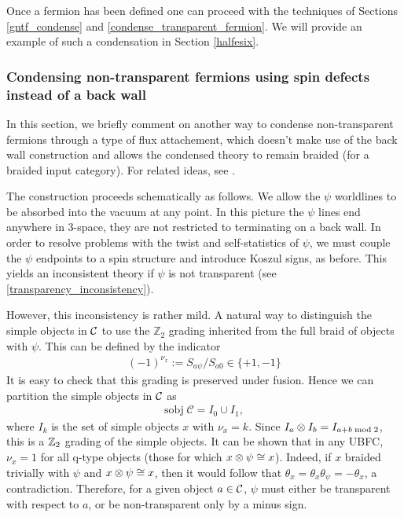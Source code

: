 Once a fermion has been defined one can proceed with the techniques of Sections \ref{gntf_condense} and \ref{condense_transparent_fermion}. 
We will provide an example of such a condensation in Section \ref{halfesix}.


\subsubsection{Condensing non-transparent fermions using spin defects instead of a back wall} \label{spin_defects_condensation}

In this section, we briefly comment on another way to condense non-transparent fermions through a type of flux attachement, 
which doesn't make use of the back wall construction and allows the condensed theory to remain braided 
(for a braided input category). 
For related ideas, see \cite{kapustin2017,thorngren2015}. 

The construction proceeds schematically as follows.
We allow the $\psi$ worldlines to be absorbed into the vacuum at any point.
In this picture the $\psi$ lines end anywhere in 3-space, they are not restricted to terminating on a back wall. 
In order to resolve problems with the twist and self-statistics of $\psi$, 
we must couple the $\psi$ endpoints to a spin structure and introduce Koszul signs, as before.
This yields an inconsistent theory if $\psi$ is not transparent (see \eqref{transparency_inconsistency}).

However, this inconsistency is rather mild. 
A natural way to distinguish the simple objects in $\mathcal{C}$ to use the $\mathbb{Z}_2$ 
grading inherited from the full braid of objects with $\psi$. 
This can be defined by the indicator 
\begin{align} 
(-1)^{\nu_x} := S_{a \psi}/S_{a0} \in \{+1, -1 \}
\label{grading}
\end{align}
It is easy to check that this grading is preserved under fusion.
Hence we can partition the simple objects in $\mathcal{C}$ as 
\begin{align} \label{braiding_indicator}
\text{sobj}\; \mathcal{C}  = I_0 \cup I_1,
\end{align}
where $I_k$ is the set of simple objects $x$ with $\nu_x = k$.
Since $I_a \otimes I_b = I_{a+b\; \text{mod} \; 2}$, this is a $\mathbb{Z}_2$ grading of the simple objects. 
It can be shown that in any UBFC, $\nu_x = 1$ for all q-type objects (those for which $x\otimes \psi \cong x$).
Indeed, if $x$ braided trivially with $\psi$ and $x\otimes \psi \cong x$, then it would follow that
$\theta_x = \theta_x \theta_\psi = -\theta_x$, a contradiction.
Therefore, for a given object $a\in\mathcal{C}$, $\psi$ must either be transparent with respect to $a$, or be non-transparent only by a minus sign. 

